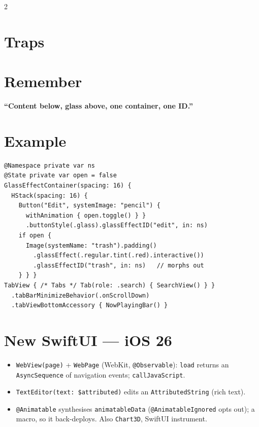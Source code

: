 \documentclass[8pt]{extarticle}
\begin{document}
\begin{multicols}{2}
\section{Traps}
\begin{itemize}
\end{itemize}

\section{Remember}
\textbf{``Content below, glass above, one container, one ID.''}

\columnbreak

\section{Example}
\begin{lstlisting}[language=SwiftSheet]
@Namespace private var ns
@State private var open = false
GlassEffectContainer(spacing: 16) {
  HStack(spacing: 16) {
    Button("Edit", systemImage: "pencil") {
      withAnimation { open.toggle() } }
      .buttonStyle(.glass).glassEffectID("edit", in: ns)
    if open {
      Image(systemName: "trash").padding()
        .glassEffect(.regular.tint(.red).interactive())
        .glassEffectID("trash", in: ns)   // morphs out
    } } }
TabView { /* Tabs */ Tab(role: .search) { SearchView() } }
  .tabBarMinimizeBehavior(.onScrollDown)
  .tabViewBottomAccessory { NowPlayingBar() }
\end{lstlisting}

\section{New SwiftUI — iOS 26}
\begin{itemize}
  \item \texttt{WebView(page)} + \texttt{WebPage} (WebKit, \texttt{@Observable}): \texttt{load}
        returns an \texttt{AsyncSequence} of navigation events; \texttt{callJavaScript}.
  \item \texttt{TextEditor(text: \$attributed)} edits an \texttt{AttributedString} (rich text).
  \item \texttt{@Animatable} synthesises \texttt{animatableData} (\texttt{@AnimatableIgnored}
        opts out); a macro, so it back-deploys. Also \texttt{Chart3D}, SwiftUI instrument.
\end{itemize}


\end{multicols}
\end{document}
